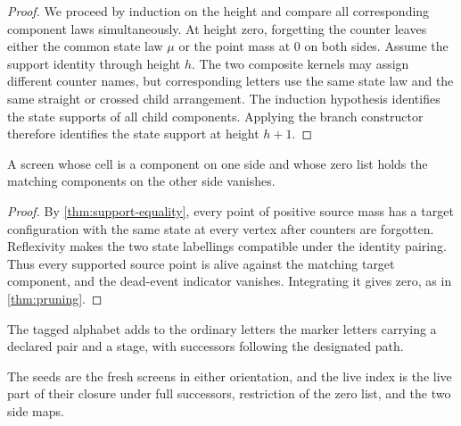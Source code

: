 \begin{proof}
\leanok
We proceed by induction on the height and compare all corresponding component laws
simultaneously. At height zero, forgetting the counter leaves either the common state law $\mu$
or the point mass at $0$ on both sides. Assume the support identity through height $h$. The two
composite kernels may assign different counter names, but corresponding letters use the same
state law and the same straight or crossed child arrangement. The induction hypothesis identifies
the state supports of all child components. Applying the branch constructor therefore identifies
the state support at height $h+1$.
\end{proof}

\begin{corollary}
\label{thm:exact-pruning}
\leanok
A screen whose cell is a component on one side and whose zero list holds the matching components
on the other side vanishes.
\end{corollary}

\begin{proof}
\leanok
{}
By \cref{thm:support-equality}, every point of positive source mass has a target configuration
with the same state at every vertex after counters are forgotten. Reflexivity makes the two state
labellings compatible under the identity pairing. Thus every supported source point is alive
against the matching target component, and the dead-event indicator vanishes. Integrating it gives
zero, as in \cref{thm:pruning}.
\end{proof}

\begin{definition}
\label{def:composite-grammar}
\leanok
{}
The tagged alphabet adds to the ordinary letters the marker letters carrying a declared pair and
a stage, with successors following the designated path.
\end{definition}

\begin{definition}
\label{def:composite-index}
\leanok
{}
The seeds are the fresh screens in either orientation, and the live index is the live part of
their closure under full successors, restriction of the zero list, and the two side maps.
\end{definition}

